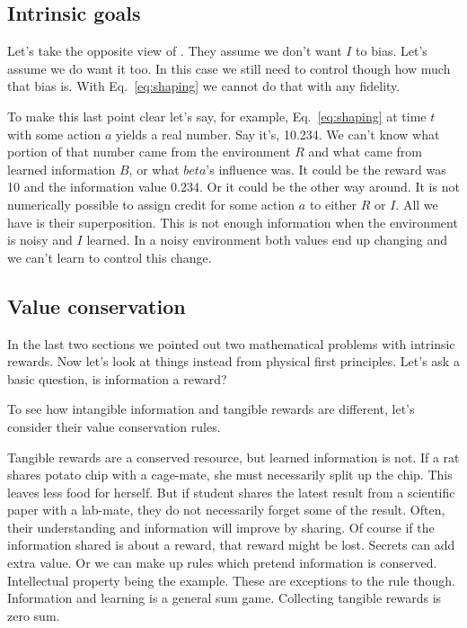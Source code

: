 \documentclass[9pt,lineno]{elife}
\begin{document}
\subsection*{Intrinsic goals}
Let's take the opposite view of \cite{Ng1999}. They assume we don't want $I$ to bias. Let's assume we do want it too. In this case we still need to control though how much that bias is. With Eq.~\ref{eq:shaping} we cannot do that with any fidelity.

To make this last point clear let's say, for example, Eq.~\ref{eq:shaping} at time $t$ with some action $a$ yields a real number. Say it's, 10.234. We can't know what portion of that number came from the environment $R$ and what came from learned information $B$, or what $beta$'s influence was. It could be the reward was 10 and the information value 0.234. Or it could be the other way around. It is not numerically possible to assign credit for some action $a$ to either $R$ or $I$. All we have is their superposition. This is not enough information when the environment is noisy and $I$ learned. In a noisy environment both values end up changing and we can't learn to control this change.

\subsection*{Value conservation}
In the last two sections we pointed out two mathematical problems with intrinsic rewards. Now let's look at things instead from physical first principles. Let's ask a basic question, is information a reward? 

To see how intangible information and tangible rewards are different, let's consider their value conservation rules.

Tangible rewards are a conserved resource, but learned information is not. If a rat shares potato chip with a cage-mate, she must necessarily split up the chip. This leaves less food for herself. But if student shares the latest result from a scientific paper with a lab-mate, they do not necessarily forget some of the result. Often, their understanding and information will improve by sharing. Of course if the information shared is about a reward, that reward might be lost. Secrets can add extra value. Or we can make up rules which pretend information is conserved. Intellectual property being the example. These are exceptions to the rule though. Information and learning is a general sum game. Collecting tangible rewards is zero sum.
\end{document}
